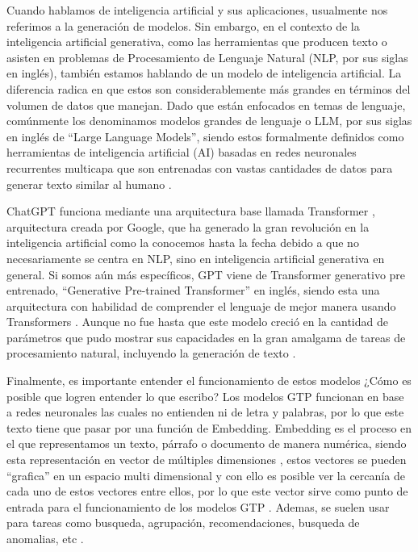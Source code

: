 
\par Cuando hablamos de inteligencia artificial y sus aplicaciones, usualmente nos referimos a la generación de modelos. Sin embargo,
en el contexto de la inteligencia artificial generativa, como las herramientas que producen texto o asisten en problemas de 
Procesamiento de Lenguaje Natural (NLP, por sus siglas en inglés), también estamos hablando de un modelo de inteligencia 
artificial. La diferencia radica en que estos son considerablemente más grandes en términos del volumen de datos que manejan. 
Dado que están enfocados en temas de lenguaje, comúnmente los denominamos modelos grandes de lenguaje o LLM, por sus siglas 
en inglés de ``Large Language Models'', siendo estos formalmente definidos como herramientas de inteligencia artificial (AI) 
basadas en redes neuronales recurrentes multicapa que son entrenadas con vastas cantidades de datos para generar texto 
similar al humano \cite{mt6}.


\par ChatGPT funciona mediante una arquitectura base llamada Transformer \cite{aiayn}, arquitectura creada por Google, que ha generado 
la gran revolución en la inteligencia artificial como la conocemos hasta la fecha debido a que no necesariamente se centra en NLP, 
sino en inteligencia artificial generativa en general. Si somos aún más específicos, GPT viene de Transformer generativo 
pre entrenado, ``Generative Pre-trained Transformer'' en inglés, siendo esta una arquitectura con habilidad de comprender el 
lenguaje de mejor manera usando Transformers \cite{mt4}. Aunque no fue hasta que este modelo creció en la cantidad de parámetros que 
pudo mostrar sus capacidades en la gran amalgama de tareas de procesamiento natural, incluyendo la generación de texto \cite{mt5}.


Finalmente, es importante entender el funcionamiento de estos modelos ¿Cómo es posible que logren entender lo que escribo? Los modelos 
GTP funcionan en base a redes neuronales las cuales no entienden ni de letra y palabras, por lo que este texto tiene que pasar por
una función de Embedding. Embedding es el proceso en el que representamos un texto, párrafo o documento de manera numérica, siendo
esta representación en vector de múltiples dimensiones \cite{eb1}, estos vectores se pueden ``grafica'' en un espacio multi dimensional y con 
ello es posible ver la cercanía de cada uno de estos vectores entre ellos, por lo que este vector sirve como punto de entrada para
el funcionamiento de los modelos GTP \cite{eb2}. Ademas, se suelen usar para tareas como busqueda, agrupación, recomendaciones, 
busqueda de anomalias, etc \cite{eb3}.

